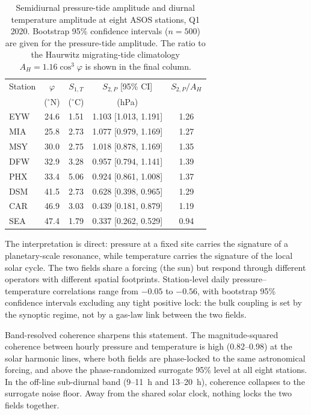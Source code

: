 \documentclass[11pt]{article}
\begin{document}
\begin{table}[t]
\centering
\caption{Semidiurnal pressure-tide amplitude and diurnal temperature amplitude at
eight ASOS stations, Q1 2020. Bootstrap 95\% confidence intervals ($n=500$) are
given for the pressure-tide amplitude. The ratio to the Haurwitz migrating-tide
climatology $A_H = 1.16\cos^3\varphi$ is shown in the final column.}
\label{tab:asos}
\begin{tabular}{lcccc}
\toprule
Station & $\varphi$ & $S_{1,T}$ & $S_{2,P}$ [95\% CI] &
$S_{2,P}/A_H$ \\
 & ($^\circ$N) & ($^\circ$C) & (hPa) & \\
\midrule
EYW & 24.6 & 1.51 & 1.103 [1.013, 1.191] & 1.26 \\
MIA & 25.8 & 2.73 & 1.077 [0.979, 1.169] & 1.27 \\
MSY & 30.0 & 2.75 & 1.018 [0.878, 1.169] & 1.35 \\
DFW & 32.9 & 3.28 & 0.957 [0.794, 1.141] & 1.39 \\
PHX & 33.4 & 5.06 & 0.924 [0.861, 1.008] & 1.37 \\
DSM & 41.5 & 2.73 & 0.628 [0.398, 0.965] & 1.29 \\
CAR & 46.9 & 3.03 & 0.439 [0.181, 0.879] & 1.19 \\
SEA & 47.4 & 1.79 & 0.337 [0.262, 0.529] & 0.94 \\
\bottomrule
\end{tabular}
\end{table}

The interpretation is direct: pressure at a fixed site carries the signature of a
planetary-scale resonance, while temperature carries the signature of the local
solar cycle. The two fields share a forcing (the sun) but respond through
different operators with different spatial footprints. Station-level daily
pressure--temperature correlations range from $-0.05$ to $-0.56$, with bootstrap
95\% confidence intervals excluding any tight positive lock: the bulk coupling is
set by the synoptic regime, not by a gas-law link between the two fields.

Band-resolved coherence sharpens this statement. The magnitude-squared coherence
between hourly pressure and temperature is high (0.82--0.98) at the solar harmonic
lines, where both fields are phase-locked to the same astronomical forcing, and
above the phase-randomized surrogate 95\% level at all eight stations. In the
off-line sub-diurnal band (9--11~h and 13--20~h), coherence collapses to the
surrogate noise floor. Away from the shared solar clock, nothing locks the two
fields together.
\end{document}
